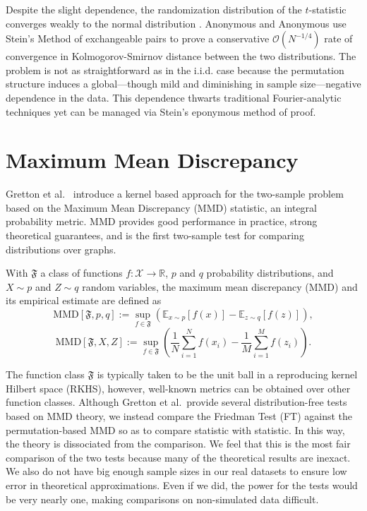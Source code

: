 Despite the slight dependence, the randomization distribution of the
$t$-statistic converges weakly to the normal distribution
\cite{lehmann1999elements}.  Anonymous and Anonymous \cite{rayholmes2012} use
Stein's Method of exchangeable pairs \cite{chen2010normal,
  stein1986approximate} to prove a conservative
$\mathcal{O}(N^{-1/4})$ rate of convergence in Kolmogorov-Smirnov
distance between the two distributions.  The problem is not as
straightforward as in the i.i.d. case because the permutation
structure induces a global---though mild and diminishing in sample
size---negative dependence in the data.  This dependence thwarts
traditional Fourier-analytic techniques yet can be managed via Stein's
eponymous method of proof.  

\section{Maximum Mean Discrepancy}
Gretton et al.\ \cite{gretton19m, gretton2010fast, gretton2012kernel,
  borgwardt2006integrating} introduce a kernel based approach for
the two-sample problem based on the Maximum Mean Discrepancy (MMD)
statistic, an integral probability metric.  MMD provides good
performance in practice, strong theoretical guarantees, and is the
first two-sample test for comparing distributions over graphs.

\begin{definition}
  With $\mathfrak{F}$ a class of functions $f:\mathcal{X} \to
  \mathbb{R}$, $p$ and $q$ probability distributions, and $X \sim p$
  and $Z \sim q$ random variables, the maximum mean discrepancy (MMD)
  and its empirical estimate are defined as 
  \begin{equation*}
    \text{MMD}[\mathfrak{F},p,q] := \sup_{f\in
      \mathfrak{F}}(\mathbb{E}_{x\sim p}[f(x)] - \mathbb{E}_{z\sim q}[f(z)]),
  \end{equation*}
  \begin{equation*}
    \text{MMD}[\mathfrak{F},X,Z] := \sup_{f\in
      \mathfrak{F}}\left (\frac{1}{N}\sum_{i=1}^Nf(x_i) -
    \frac{1}{M}\sum_{i=1}^M f(z_i) \right ).
  \end{equation*}
\end{definition}

The function class $\mathfrak{F}$ is typically taken to be the unit ball in a
reproducing kernel Hilbert space (RKHS), however, well-known metrics
can be obtained over other function classes.  Although Gretton et
al.\ provide several distribution-free tests based on MMD theory, we
instead compare the Friedman Test (FT) against the permutation-based
MMD so as to compare statistic with statistic.  In this way, the
theory is dissociated from the comparison.  We feel that this is the
most fair comparison of the two tests because many of the theoretical
results are inexact.  We also do not have big enough sample sizes in
our real datasets to ensure low error in theoretical approximations.
Even if we did, the power for the tests would be very nearly one,
making comparisons on non-simulated data difficult.

